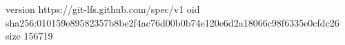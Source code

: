 version https://git-lfs.github.com/spec/v1
oid sha256:010159e89582357b8be2f4ac76d00b0b74e120e6d2a18066c98f6335e0cfdc26
size 156719
